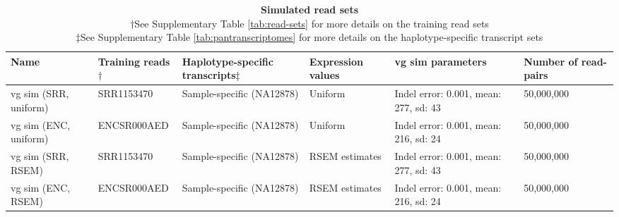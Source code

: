 \documentclass[11pt]{ucthesis}
\begin{document}
\begin{table}[H]
\ssp
\footnotesize
\begin{tabular}{L{0.12\textwidth}| L{0.14\textwidth} | L{0.13\textwidth} | L{0.12\textwidth} | L{0.15\textwidth} | R{0.11\textwidth}}
\textbf{Name} & \textbf{Training reads}$\dag$ & \textbf{Haplotype-specific transcripts}$\ddag$ & \textbf{Expression values} & \textbf{vg sim parameters} & \textbf{Number of read-pairs} \\
\midrule
vg sim (SRR, uniform) & SRR1153470 & Sample-specific (NA12878) & Uniform& Indel error: 0.001, mean: 277, sd: 43 & 50,000,000 \\
\midrule
vg sim (ENC, uniform) & ENCSR000AED & Sample-specific (NA12878) & Uniform & Indel error: 0.001, mean: 216, sd: 24 & 50,000,000 \\
\midrule
vg sim (SRR, RSEM) & SRR1153470 & Sample-specific (NA12878) & RSEM estimates & Indel error: 0.001, mean: 277, sd: 43 & 50,000,000 \\
\midrule
vg sim (ENC, RSEM) & ENCSR000AED & Sample-specific (NA12878) & RSEM estimates & Indel error: 0.001, mean: 216, sd: 24 & 50,000,000
\end{tabular}
\caption{\textbf{Simulated read sets}\\
$\dag$See Supplementary Table \ref{tab:read-sets} for more details on the training read sets \\
$\ddag$See Supplementary Table \ref{tab:pantranscriptomes} for more details on the haplotype-specific transcript sets}
\label{tab:sim-data}
\end{table}
\end{document}
